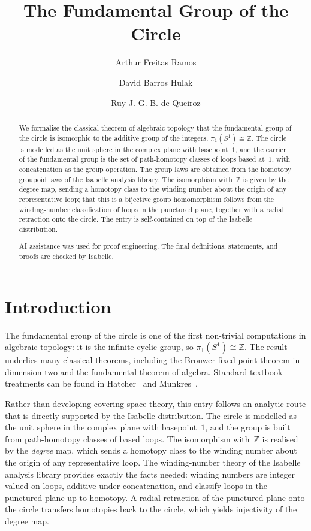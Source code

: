\documentclass[11pt,a4paper]{article}
\begin{document}
\title{The Fundamental Group of the Circle}
\author{Arthur Freitas Ramos \and David Barros Hulak \and Ruy J. G. B. de Queiroz}
\maketitle

\begin{abstract}
  We formalise the classical theorem of algebraic topology that the
  fundamental group of the circle is isomorphic to the additive group of the
  integers, $\pi_1(S^1) \cong \mathbb{Z}$.  The circle is modelled as the unit
  sphere in the complex plane with basepoint~$1$, and the carrier of the
  fundamental group is the set of path-homotopy classes of loops based
  at~$1$, with concatenation as the group operation.  The group laws are
  obtained from the homotopy groupoid laws of the Isabelle analysis library.
  The isomorphism with~$\mathbb{Z}$ is given by the degree map, sending a
  homotopy class to the winding number about the origin of any representative
  loop; that this is a bijective group homomorphism follows from the
  winding-number classification of loops in the punctured plane, together
  with a radial retraction onto the circle.  The entry is self-contained on
  top of the Isabelle distribution.

  AI assistance was used for proof engineering.  The final definitions,
  statements, and proofs are checked by Isabelle.
\end{abstract}

\tableofcontents

\section{Introduction}

The fundamental group of the circle is one of the first non-trivial
computations in algebraic topology: it is the infinite cyclic group, so
$\pi_1(S^1) \cong \mathbb{Z}$.  The result underlies many classical
theorems, including the Brouwer fixed-point theorem in dimension two and the
fundamental theorem of algebra.  Standard textbook treatments can be found in
Hatcher~\cite{Hatcher2002} and Munkres~\cite{Munkres2000}.

Rather than developing covering-space theory, this entry follows an analytic
route that is directly supported by the Isabelle distribution.  The circle is
modelled as the unit sphere in the complex plane with basepoint~$1$, and the
group is built from path-homotopy classes of based loops.  The isomorphism
with~$\mathbb{Z}$ is realised by the \emph{degree} map, which sends a homotopy
class to the winding number about the origin of any representative loop.  The
winding-number theory of the Isabelle analysis library
provides exactly the facts needed: winding numbers are integer valued on
loops, additive under concatenation, and classify loops in the punctured
plane up to homotopy.  A radial retraction of the punctured plane onto the
circle transfers homotopies back to the circle, which yields injectivity of
the degree map.





\end{document}
